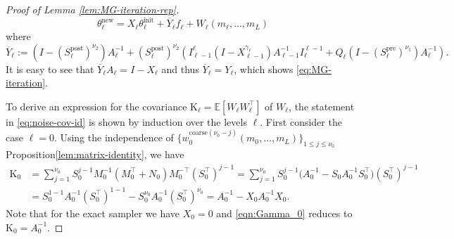 \documentclass[11pt,english]{article}
\theoremstyle{plain}
\theoremstyle{plain}
\theoremstyle{plain}
\theoremstyle{plain}
\numberwithin{equation}{section}
\newcommand*{\id}{I}
\newcommand*{\WCov}{\mathrm{K}}
\begin{document}
\begin{proof}[Proof of Lemma \ref{lem:MG-iteration-rep}]
	\begin{equation}
		\theta_\ell^{\mathrm{new}} = X_\ell \theta_\ell^{\mathrm{init}}+ \overline{Y}_\ell f_\ell + W_\ell(m_{\ell},\dots,m_L)
	\end{equation}
	where
	\begin{equation}
		\overline{Y}_\ell := (\id-(S_\ell^{\mathrm{post}})^{\nu_2})A_\ell^{-1} + (S_\ell^{\mathrm{post}})^{\nu_2}\left(I_{\ell-1}^{\ell}(\id-X_{\ell-1}^{\gamma_\ell})A_{\ell-1}^{-1}I_{\ell}^{\ell-1} + Q_\ell (\id-(S_\ell^{\mathrm{pre}})^{\nu_1})A_{\ell}^{-1}\right).
	\end{equation}
	It is easy to see that $\overline{Y}_\ell A_\ell = \id -X_\ell$ and thus $\overline{Y}_\ell=Y_\ell$, which shows \eqref{eq:MG-iteration}.

	To derive an expression for the covariance $\WCov_{\ell}=\mathbb{E}[W_\ell W_\ell^\top]$ of $W_\ell$, the statement in \eqref{eq:noise-cov-id} is shown by induction over the levels $\ell$. First consider the case $\ell=0$. Using
	the independence of $\{w_{0}^{\mathrm{coarse}(\nu_{0}-j)}(m_{0},\dots,m_{L})\}_{1\leq j\leq\nu_{0}}$
	Proposition\ref{lem:matrix-identity}, we have
	\begin{align}
		\WCov_{0} & =\sum_{j=1}^{\nu_{0}}S_{0}^{j-1}M_{0}^{-1}(M_{0}^{\top}+N_{0})M_{0}^{-\top}(S_{0}^{\top})^{j-1}=\sum_{j=1}^{\nu_{0}}S_{0}^{j-1}\bigl(A_{0}^{-1}-S_{0}A_{0}^{-1}S_{0}^{\top}\bigr)(S_{0}^{\top})^{j-1} \\
		          & =S_{0}^{1-1}A_{0}^{-1}(S_{0}^{\top})^{1-1}-S_{0}^{\nu_{0}}A_{0}^{-1}(S_{0}^{\top})^{\nu_{0}}=A_{0}^{-1}-X_{0}A_{0}^{-1}X_{0}.
		\label{eqn:Gamma_0}
	\end{align}
	Note that for the exact sampler we have $X_{0}=0$ and \eqref{eqn:Gamma_0} reduces to $\WCov_{0}=A_{0}^{-1}$.


\end{proof}
\end{document}
